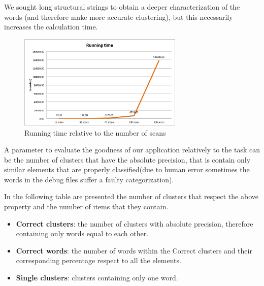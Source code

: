 We sought long structural strings to obtain a deeper characterization of the words (and therefore make more accurate clustering), but this necessarily increases the calculation time.

\begin{figure}[!htbp]
\centering
\includegraphics[width=0.7\textwidth]{images/esecuzione}
\caption{Running time relative to the number of scans}
\label{fig:time}
\end{figure}

A parameter to evaluate the goodness of our application relatively to the task can be the number of clusters that have the absolute precision, that is contain only similar elements that are properly classified(due to human error sometimes the words in the debug files suffer a faulty categorization).

In the following table are presented the number of clusters that respect the above property and the number of items that they contain. 

\begin{itemize}

\item \textbf{Correct clusters}: the number of clusters with absolute precision, therefore containing only words equal to each other.
\item \textbf{Correct words}: the number of words within the Correct clusters and their corresponding percentage respect to all the elements.
\item \textbf{Single clusters}: clusters containing only one word.
\end{itemize}

